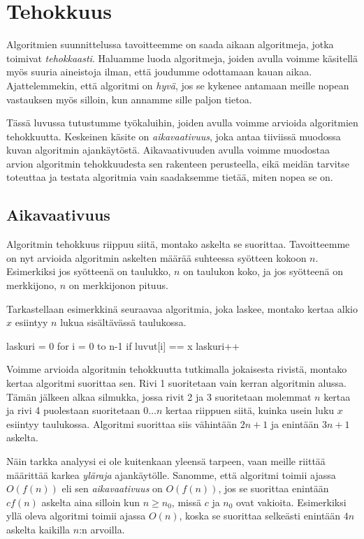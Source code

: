 \chapter{Tehokkuus}

Algoritmien suunnittelussa tavoitteemme on saada aikaan
algoritmeja, jotka toimivat \emph{tehokkaasti}.
Haluamme luoda algoritmeja, joiden avulla voimme
käsitellä myös suuria aineistoja ilman, että joudumme
odottamaan kauan aikaa.
Ajattelemmekin, että algoritmi on \emph{hyvä},
jos se kykenee antamaan meille nopean vastauksen myös silloin,
kun annamme sille paljon tietoa.

Tässä luvussa tutustumme työkaluihin, joiden avulla
voimme arvioida algoritmien tehokkuutta.
Keskeinen käsite on \emph{aikavaativuus}, joka antaa
tiiviissä muodossa kuvan algoritmin ajankäytöstä.
Aikavaativuuden avulla voimme muodostaa arvion
algoritmin tehokkuudesta sen rakenteen perusteella,
eikä meidän tarvitse toteuttaa ja testata algoritmia
vain saadaksemme tietää, miten nopea se on.

\section{Aikavaativuus}


Algoritmin tehokkuus riippuu siitä, montako askelta se suorittaa.
Tavoitteemme on nyt arvioida algoritmin askelten määrää
suhteessa syötteen kokoon $n$.
Esimerkiksi jos syötteenä on taulukko,
$n$ on taulukon koko,
ja jos syötteenä on merkkijono,
$n$ on merkkijonon pituus.

Tarkastellaan esimerkkinä seuraavaa algoritmia,
joka laskee, montako kertaa alkio $x$ esiintyy
$n$ lukua sisältävässä taulukossa.

\begin{code}[numbers=left]
laskuri = 0
for i = 0 to n-1
    if luvut[i] == x
        laskuri++
\end{code}

Voimme arvioida algoritmin tehokkuutta tutkimalla
jokaisesta rivistä, montako kertaa algoritmi suorittaa sen.
Rivi 1 suoritetaan vain kerran algoritmin alussa.
Tämän jälkeen alkaa silmukka, jossa
rivit 2 ja 3 suoritetaan molemmat $n$ kertaa
ja rivi 4 puolestaan suoritetaan $0 \dots n$
kertaa riippuen siitä, kuinka usein
luku $x$ esiintyy taulukossa.
Algoritmi suorittaa siis vähintään $2n+1$ ja enintään $3n+1$
askelta.

Näin tarkka analyysi ei ole kuitenkaan yleensä tarpeen,
vaan meille riittää määrittää karkea \emph{yläraja} ajankäytölle.
Sanomme, että algoritmi toimii ajassa $O(f(n))$ eli sen
\emph{aikavaativuus} on $O(f(n))$, jos se suorittaa
enintään $c f(n)$ askelta aina silloin kun $n \ge n_0$,
missä $c$ ja $n_0$ ovat vakioita.
Esimerkiksi yllä oleva algoritmi toimii ajassa $O(n)$,
koska se suorittaa selkeästi enintään $4n$ askelta
kaikilla $n$:n arvoilla.

